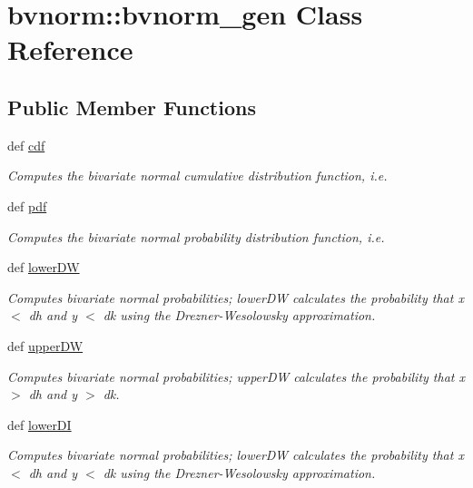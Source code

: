 \hypertarget{classbvnorm_1_1bvnorm__gen}{
\section{bvnorm::bvnorm\_\-gen Class Reference}
\label{classbvnorm_1_1bvnorm__gen}
}
\subsection*{Public Member Functions}
\begin{CompactItemize}
\item 
def \hyperlink{classbvnorm_1_1bvnorm__gen_628377c8e017c5314b8a5ef36db8d892}{cdf}
\begin{CompactList}\small\item\em Computes the bivariate normal cumulative distribution function, i.e. \item\end{CompactList}\item 
def \hyperlink{classbvnorm_1_1bvnorm__gen_e259683554c1efa1017f733f0824a38a}{pdf}
\begin{CompactList}\small\item\em Computes the bivariate normal probability distribution function, i.e. \item\end{CompactList}\item 
def \hyperlink{classbvnorm_1_1bvnorm__gen_eee6362a2e4206e66e79425e4f5431d5}{lowerDW}
\begin{CompactList}\small\item\em Computes bivariate normal probabilities; lowerDW calculates the probability that x $<$ dh and y $<$ dk using the Drezner-Wesolowsky approximation. \item\end{CompactList}\item 
def \hyperlink{classbvnorm_1_1bvnorm__gen_bd58b5d4090258a364bcb50619b24b08}{upperDW}
\begin{CompactList}\small\item\em Computes bivariate normal probabilities; upperDW calculates the probability that x $>$ dh and y $>$ dk. \item\end{CompactList}\item 
def \hyperlink{classbvnorm_1_1bvnorm__gen_00b5b765f63ca54c859717b98744d9dc}{lowerDI}
\begin{CompactList}\small\item\em Computes bivariate normal probabilities; lowerDW calculates the probability that x $<$ dh and y $<$ dk using the Drezner-Wesolowsky approximation. \item\end{CompactList}\item 

\end{CompactItemize}
